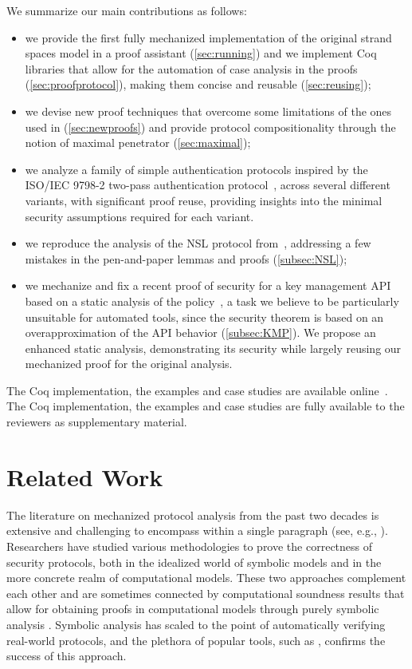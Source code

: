 We summarize our main contributions as follows:
\begin{itemize}
\item we provide the first fully mechanized implementation of the original strand spaces model in a proof assistant (\cref{sec:running}) and we implement Coq libraries that allow for the automation of case analysis in the proofs (\cref{sec:proofprotocol}), making them concise and reusable (\cref{sec:reusing});
\item we devise new proof techniques that overcome some limitations of the ones used in \cite{FHG98} (\cref{sec:newproofs}) and provide protocol compositionality through the notion of maximal penetrator (\cref{sec:maximal});
\item we analyze a family of simple authentication protocols inspired by the ISO/IEC 9798-2 two-pass authentication protocol~\cite{ISO97982}, across several different variants, with significant proof reuse,  providing insights into the minimal security assumptions required for each variant.
\item we reproduce the analysis of the NSL protocol from~\cite{FHG98}, addressing a few mistakes in the pen-and-paper lemmas and proofs (\cref{subsec:NSL});
\item we mechanize and fix a recent proof of security for a key management API based on a static analysis of the policy~\cite{focardi2021secure}, a
task we believe to be particularly unsuitable for automated tools, since the security theorem is based on an overapproximation of the API behavior (\cref{subsec:KMP}). We propose an enhanced static analysis, demonstrating its security while largely reusing our mechanized proof for the original analysis.
\end{itemize}

\ifdefined\CAMERAREADY
   The Coq implementation, the examples and case studies are available online~\cite{strandsrocqcode}. 
\else
{} The Coq implementation, the examples and case studies are fully available to the reviewers as supplementary material.
\fi

\section{Related Work}


The literature on mechanized protocol analysis from the past two decades is extensive and challenging to encompass within a single paragraph (see, e.g., \cite{barbosa:SoKCAC,blanchetPOST2012,CortierSurvey2011}). Researchers have studied various methodologies to prove the correctness of security protocols, both in the idealized world of symbolic models and in the more concrete realm of computational models. These two approaches complement each other and are sometimes connected by computational soundness results that allow for obtaining proofs in computational models through purely symbolic analysis \cite{blanchetPOST2012}.
Symbolic analysis has scaled to the point of automatically verifying real-world protocols, and the plethora of popular tools, such as \cite{cpsa,BSCS20,EMM09,MSCB13,Paulson98}, confirms the success
of this approach.

